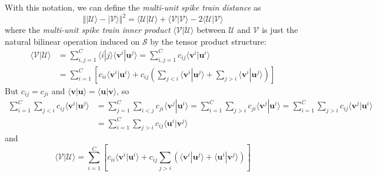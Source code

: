 \documentclass[11pt,a4paper]{article}
\newcommand{\norm}[1]{\left\Vert #1 \right\Vert}
\newcommand{\ket}[1]{|#1\rangle}
\newcommand{\braket}[2]{\langle #1|#2 \rangle}
\newcommand{\cU}{\mathcal{U}}
\newcommand{\cV}{\mathcal{V}}
\newcommand{\bu}{\boldsymbol{u}}
\newcommand{\bv}{\boldsymbol{v}}
\begin{document}
With this notation, we can define the \emph{multi-unit spike train
  distance} as 
\begin{equation}
  \label{eq:distance_as_intprod}
  \norm{\ket{\cU} - \ket{\cV}}^2 = \braket{\cU}{\cU} + \braket{\cV}{\cV}
- 2 \braket{\cU}{\cV}
\end{equation}
where the \emph{multi-unit spike train inner product}
$\braket{\cV}{\cU}$ between $\cU$ and $\cV$ is just the natural
bilinear operation induced on $\mathcal{S}$ by the tensor product
structure:
\begin{equation}
  \label{eq:multiunit_intprod}
  \begin{split}
    \braket{\cV}{\cU} &= \sum_{i,j=1}^C
    \braket{i}{j}\braket{\bv^i}{\bu^j}
    = \sum_{i,j=1}^C c_{ij}\braket{\bv^i}{\bu^i}\\
    &= \sum_{i=1}^C\left[ c_{ii}
      \braket{\bv^i}{\bu^i} + c_{ij}
      \left(\sum_{j<i}\braket{\bv^i}{\bu^j} +
        \sum_{j>i}\braket{\bv^i}{\bu^j} \right) \right]
  \end{split}
\end{equation}
But $c_{ij}=c_{ji}$ and $\braket{\bv}{\bu}=\braket{\bu}{\bv}$, so
\begin{equation*}
  \begin{split}
    \sum_{i=1}^C\sum_{j<i}c_{ij}\braket{\bv^i}{\bu^j} &=
    \sum_{j=1}^C\sum_{i<j}c_{ji}\braket{\bv^j}{\bu^i} = 
    \sum_{i=1}^C\sum_{j>i}c_{ji}\braket{\bv^j}{\bu^i} =
    \sum_{i=1}^C\sum_{j>i}c_{ij}\braket{\bv^j}{\bu^i}\\
    &=\sum_{i=1}^C\sum_{j>i}c_{ij}\braket{\bu^i}{\bv^j}
  \end{split}
\end{equation*}
and
\begin{equation}
    \label{eq:multiprod_j_ge_i}
    \braket{\cV}{\cU} = \sum_{i=1}^C\left[ c_{ii}
      \braket{\bv^i}{\bu^i} + c_{ij}
      \sum_{j>i}\left(\braket{\bv^i}{\bu^j} +
        \braket{\bu^i}{\bv^j} \right) \right]
\end{equation}
\end{document}
